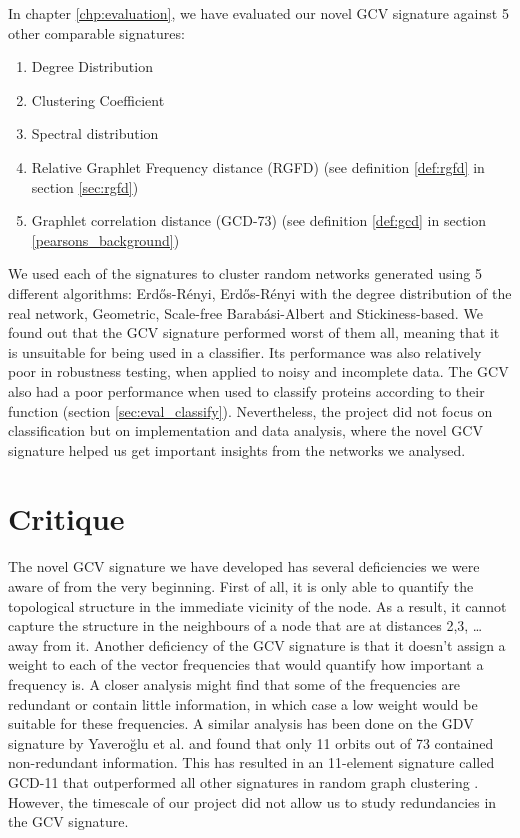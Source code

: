 In chapter \ref{chp:evaluation}, we have evaluated our novel GCV signature against 5 other comparable signatures:
\begin{enumerate}
 \item Degree Distribution
 \item Clustering Coefficient
 \item Spectral distribution
 \item Relative Graphlet Frequency distance (RGFD) (see definition \ref{def:rgfd} in section \ref{sec:rgfd})
 \item Graphlet correlation distance (GCD-73) (see definition \ref{def:gcd} in section \ref{pearsons_background})
\end{enumerate}

We used each of the signatures to cluster random networks generated using 5 different algorithms: Erd\H{o}s-R\'{e}nyi, Erd\H{o}s-R\'{e}nyi with the degree distribution of the real network, Geometric, Scale-free Barab\'{a}si-Albert and Stickiness-based. We found out that the GCV signature performed worst of them all, meaning that it is unsuitable for being used in a classifier. Its performance was also relatively poor in robustness testing, when applied to noisy and incomplete data. The GCV also had a poor performance when used to classify proteins according to their function (section \ref{sec:eval_classify}). Nevertheless, the project did not focus on classification but on implementation and data analysis, where the novel GCV signature helped us get important insights from the networks we analysed.

\section{Critique}

The novel GCV signature we have developed has several deficiencies we were aware of from the very beginning. First of all, it is only able to quantify the topological structure in the immediate vicinity of the node. As a result, it cannot capture the structure in the neighbours of a node that are at distances 2,3, \dots away from it. Another deficiency of the GCV signature is that it doesn't assign a weight to each of the vector frequencies that would quantify how important a frequency is. A closer analysis might find that some of the frequencies are redundant or contain little information, in which case a low weight would be suitable for these frequencies. A similar analysis has been done on the GDV signature by Yavero\u{g}lu et al. \cite{yaverouglu2014revealing} and found that only 11 orbits out of 73 contained non-redundant information. This has resulted in an 11-element signature called GCD-11 that outperformed all other signatures in random graph clustering \cite{yaverouglu2014revealing}. However, the 
timescale of our project did not allow us to study redundancies in the GCV signature.


